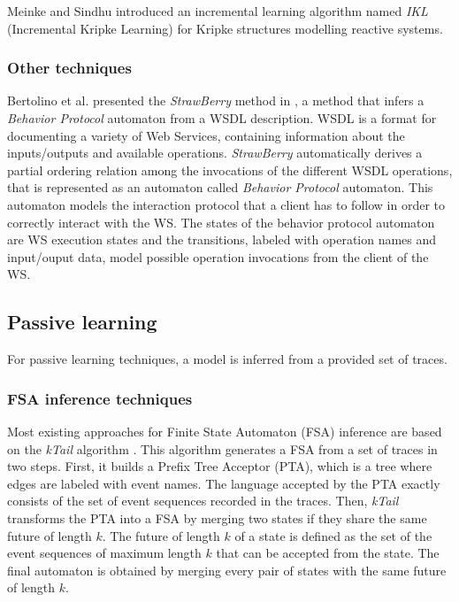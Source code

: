 Meinke and Sindhu \cite{tap2011} introduced an incremental
learning algorithm named \textit{IKL} (Incremental Kripke
Learning) for Kripke structures modelling reactive systems.


\subsubsection{Other techniques}
\label{sec:related:modelinf:active-others}

Bertolino et al. presented the \textit{StrawBerry} method in
\cite{Bertolino:2009:ASB:1595696.1595719}, a method that infers a
\textit{Behavior Protocol} automaton from a WSDL description.
WSDL is a format for documenting a variety of Web Services,
containing information about the inputs/outputs and available
operations. \textit{StrawBerry} automatically derives a partial
ordering relation among the invocations of the different WSDL
operations, that is represented as an automaton called
\textit{Behavior Protocol} automaton. This automaton models the
interaction protocol that a client has to follow in order to
correctly interact with the WS. The states of the behavior
protocol automaton are WS execution states and the transitions,
labeled with operation names and input/ouput data, model
possible operation invocations from the client of the WS.


\subsection{Passive learning}
\label{sec:related:modelinf:passive}

For passive learning techniques, a model is inferred from a
provided set of traces.

\subsubsection{FSA inference techniques}
\label{sec:related:modelinf:passive-fsa}

Most existing approaches for Finite State Automaton (FSA)
inference are based on the \textit{kTail} algorithm
\cite{5009015}. This algorithm generates a FSA from a set of
traces in two steps.  First, it builds a Prefix Tree Acceptor
(PTA), which is a tree where edges are labeled with event names.
The language accepted by the PTA exactly consists of the set of
event sequences recorded in the traces. Then, \textit{kTail}
transforms the PTA into a FSA by merging two states if they share
the same future of length $k$. The future of length $k$ of a
state is defined as the set of the event sequences of maximum
length $k$ that can be accepted from the state. The final
automaton is obtained by merging every pair of states with the
same future of length $k$.

